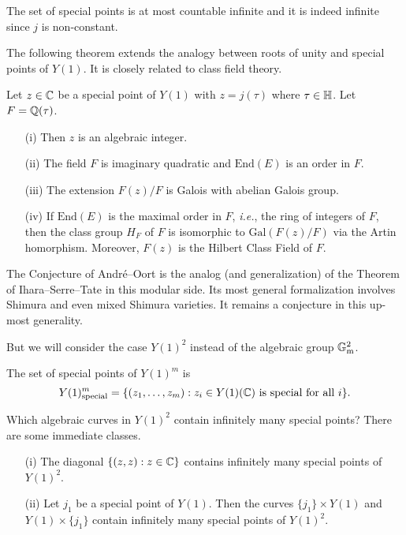 The set of special points is at most countable infinite and it is
indeed infinite since $j$ is non-constant.

The following theorem extends the analogy between roots of unity and
special points of $Y(1)$. It is closely related to class field theory.

\begin{theorem}
  \label{thm:galoisspecial}
  Let $z\in {\mathbb{C}}$ be a special point of $Y(1)$ with $z=j(\tau)$ where
  $\tau\in {\mathbb{H}}$. Let $F={\mathbb{Q}}(\tau)$.
  \begin{enumerate}
  \item [(i)] Then $z$ is an algebraic integer.
  \item[(ii)] The field $F$ is
    imaginary quadratic and   $\mathrm{End}(E)$ is an order
    in $F$.
  \item[(iii)] The extension $F(z)/F$ is Galois with abelian Galois
    group.
  \item[(iv)] If $\mathrm{End}(E)$ is the maximal order in $F$,
    \textit{i.e.}, the ring of integers of $F$, then
    the class group $H_F$ of $F$ is isomorphic to
    $\mathrm{Gal}(F(z)/F)$ via the Artin homorphism.
    Moreover, $F(z)$ is the Hilbert Class Field of $F$. 
  \end{enumerate}
\end{theorem}

The Conjecture of Andr\'e--Oort is the analog (and generalization) of
the Theorem of Ihara--Serre--Tate in this modular side. Its most
general formalization involves Shimura and even mixed Shimura
varieties. It remains a conjecture in this up-most generality. 

But we will consider the case $Y(1)^2$ instead of the algebraic group
${\mathbb{G}}_{\mathrm{m}}^2$.
\begin{definition}
  \label{def:specialY1m}
  The set of special points of  $Y(1)^m$ is
  $$Y(1)^m_{\mathrm{special}}=\{(z_1,\ldots,z_m) :
  z_i\in Y(1)({\mathbb{C}})\text{ is special for all $i$} \}.$$
\end{definition}

Which algebraic curves in $Y(1)^2$ contain infinitely many special
points? There are some immediate classes.

\begin{example}
  \begin{enumerate}
  \item[(i)] The diagonal  $\{(z,z) : z\in{\mathbb{C}}\}$ contains infinitely
    many special points of $Y(1)^2$. 
  \item [(ii)]  Let $j_1$ be a special point of $Y(1)$.  Then the curves
    $\{j_1\}\times Y(1)$ and $Y(1)\times \{j_1\}$ contain infinitely many
    special points of $Y(1)^2$. 
  \end{enumerate}
\end{example}

